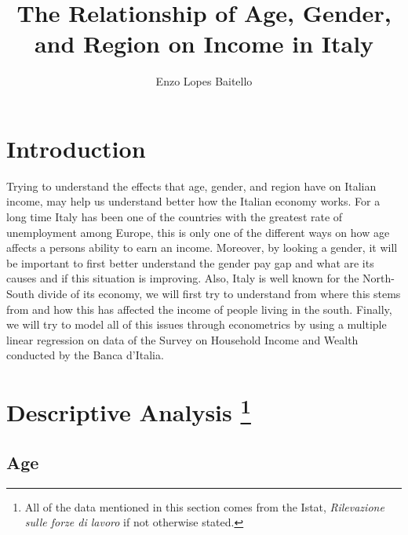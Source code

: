 \documentclass[12pt]{article}
\title{The Relationship of Age, Gender, and Region on Income in Italy}
\author{Enzo Lopes Baitello}
\begin{document}
\maketitle

\clearpage
\tableofcontents

\clearpage
\section{Introduction}

\begin{spacing}{1.5}

Trying to understand the effects that age, gender, and region have on Italian income, may help us understand better how the Italian economy works. For a long time Italy has been one of the countries with the greatest rate of unemployment among Europe, this is only one of the different ways on how age affects a persons ability to earn an income. Moreover, by looking a gender, it will be important to first better understand the gender pay gap and what are its causes and if this situation is improving. Also, Italy is well known for the North-South divide of its economy, we will first try to understand from where this stems from and how this has affected the income of people living in the south. Finally, we will try to model all of this issues through econometrics by using a multiple linear regression on data of the Survey on Household Income and Wealth conducted by  the Banca d'Italia.

\end{spacing}

\section[Descriptive Analysis]{Descriptive Analysis \footnote{All of the data mentioned in this section comes from the Istat, \textit{Rilevazione sulle forze di lavoro} if not otherwise stated.}} 

\subsection{Age}
\end{document}
